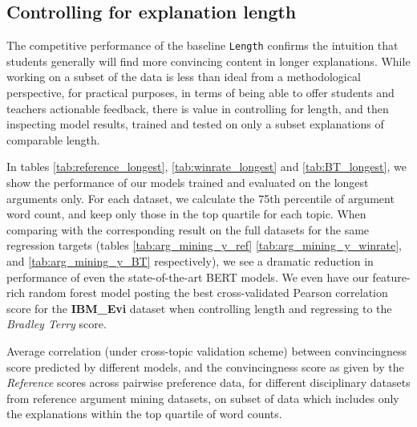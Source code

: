 \documentclass[notitlepage,12pt]{jedm}
\begin{document}
\subsection{Controlling for explanation length}

The competitive performance of the baseline \verb|Length| confirms the 
intuition that students generally will find more convincing content in longer 
explanations.
While working on a subset of the data is less than ideal from a methodological 
perspective, for practical purposes, in terms of being able to offer students 
and teachers actionable feedback, there is value in controlling for length, and 
then inspecting model results, trained and tested on only a subset explanations 
of comparable length.

In tables \ref{tab:reference_longest}, \ref{tab:winrate_longest} and 
\ref{tab:BT_longest}, we show the performance of our models trained and 
evaluated on the longest arguments only. 
For each dataset, we calculate the 75th percentile of argument word count, and 
keep only those in the top quartile for each topic.
When comparing with the corresponding result on the full datasets for the same 
regression targets (tables \ref{tab:arg_mining_y_ref} 
\ref{tab:arg_mining_y_winrate}, and \ref{tab:arg_mining_y_BT} respectively), we 
see a dramatic reduction in performance of even the state-of-the-art BERT 
models.
We even have our feature-rich random forest model posting the best 
cross-validated Pearson correlation score for the \textbf{IBM\_Evi} dataset 
when controlling length and regressing to the \textit{Bradley Terry} score.

\begin{table}
	\parbox{.45\linewidth}{
		\centering
		
	}
	\hfill
	\parbox{.45\linewidth}{
		\centering
		
	}
	\caption{
		Average correlation (under cross-topic validation scheme) between 
		convincingness score predicted by different models, and the 
		convincingness score as given by the \textit{Reference} scores across 
		pairwise preference data, for different disciplinary datasets from 
		reference argument mining datasets, on subset of data which includes 
		only the explanations within the top quartile of word counts.
	}
	\label{tab:reference_longest}
\end{table}
\end{document}
